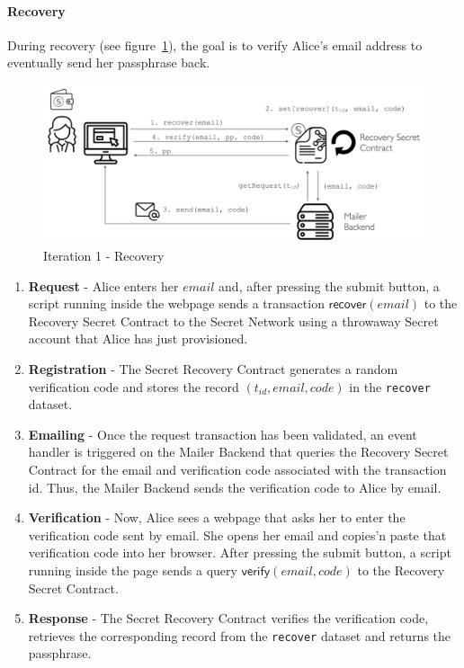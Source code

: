 \documentclass[12pt]{article}
\newcommand{\ms}[1]{\ensuremath{\mathsf{#1}}}
\begin{document}
\paragraph{Recovery}

During recovery (see figure~\ref{it1:recovery}), the goal is to verify Alice's email address to eventually send her passphrase back. 


\begin{figure}[h!]
  \includegraphics[width=\linewidth]{./media/media-002.png}
  \caption{Iteration 1 - Recovery}
  \label{it1:recovery}
\end{figure}

\begin{enumerate}
\item {\bf Request} - Alice enters her $email$ and, after pressing the submit button, a script running inside the webpage sends a transaction {\bf $\ms{recover}(email)$} to the Recovery Secret Contract to the Secret Network using a throwaway Secret account that Alice has just provisioned. 
\item {\bf Registration} - The Secret Recovery Contract generates a random verification code and stores the record $(t_{id}, email, code)$ in the {\tt recover} dataset. 
\item {\bf Emailing} - Once the request transaction has been validated, an event handler is triggered on the Mailer Backend that queries the Recovery Secret Contract for the email and verification code associated with the transaction id. Thus, the Mailer Backend sends the verification code to Alice by email. 
\item {\bf Verification} - Now, Alice sees a webpage that asks her to enter the verification code sent by email. She opens her email and copies'n paste that verification code into her browser. After pressing the submit button, a script running inside the page sends a query $\ms{verify}(email, code)$ to the Recovery Secret Contract. 
\item {\bf Response} - The Secret Recovery Contract verifies the verification code, retrieves the corresponding record from the {\tt recover} dataset and returns the passphrase.
\end{enumerate}
\end{document}
